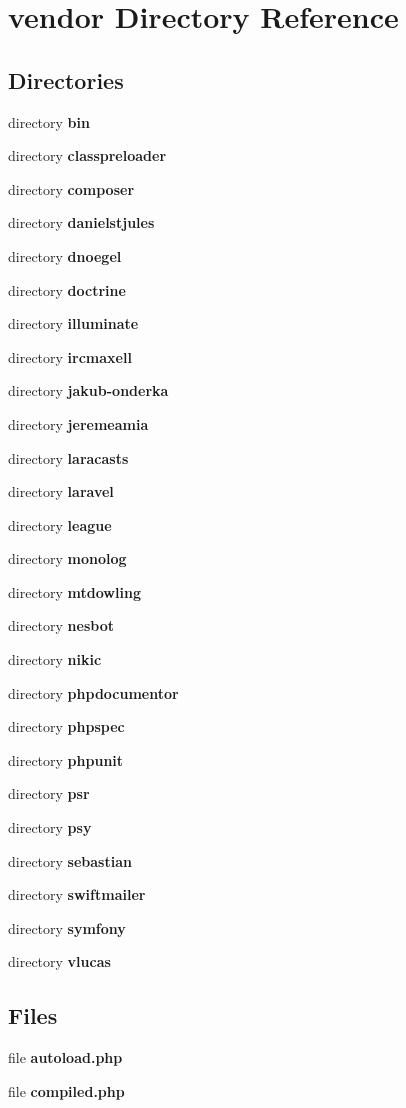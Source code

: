 \section{vendor Directory Reference}
\label{dir_34354923d6ed932f299d368031e9bb50}
\subsection*{Directories}
\begin{DoxyCompactItemize}
\item 
directory {\bf bin}
\item 
directory {\bf classpreloader}
\item 
directory {\bf composer}
\item 
directory {\bf danielstjules}
\item 
directory {\bf dnoegel}
\item 
directory {\bf doctrine}
\item 
directory {\bf illuminate}
\item 
directory {\bf ircmaxell}
\item 
directory {\bf jakub-\/onderka}
\item 
directory {\bf jeremeamia}
\item 
directory {\bf laracasts}
\item 
directory {\bf laravel}
\item 
directory {\bf league}
\item 
directory {\bf monolog}
\item 
directory {\bf mtdowling}
\item 
directory {\bf nesbot}
\item 
directory {\bf nikic}
\item 
directory {\bf phpdocumentor}
\item 
directory {\bf phpspec}
\item 
directory {\bf phpunit}
\item 
directory {\bf psr}
\item 
directory {\bf psy}
\item 
directory {\bf sebastian}
\item 
directory {\bf swiftmailer}
\item 
directory {\bf symfony}
\item 
directory {\bf vlucas}
\end{DoxyCompactItemize}
\subsection*{Files}
\begin{DoxyCompactItemize}
\item 
file {\bf autoload.\+php}
\item 
file {\bf compiled.\+php}
\end{DoxyCompactItemize}
